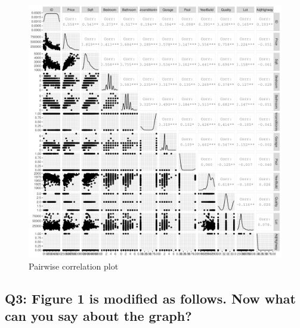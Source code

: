 \documentclass[]{article}
\begin{document}
\begin{figure}
\centering
\includegraphics{multicollinearity_questions_files/figure-latex/unnamed-chunk-4-1.pdf}
\caption{Pairwise correlation plot}
\end{figure}

\newpage

\hypertarget{q3-figure-1-is-modified-as-follows.-now-what-can-you-say-about-the-graph}{%
\subsection{Q3: Figure 1 is modified as follows. Now what can you say
about the
graph?}\label{q3-figure-1-is-modified-as-follows.-now-what-can-you-say-about-the-graph}}
\end{document}
